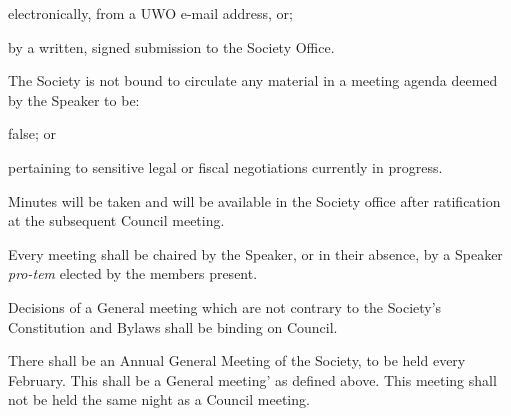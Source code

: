 \begin{longenum}[ label*=\thesubsection.\arabic*., align=left]
    \begin{longenum}[ label*=\arabic*., align=left]
		\item electronically, from a UWO e-mail address, or;
        \item by a written, signed submission to the Society Office.
	\end{longenum}
    \item The Society is not bound to circulate any material in a meeting agenda deemed by the Speaker to be:
    \begin{longenum}[ label*=\arabic*., align=left]
		\item false; or
        \item pertaining to sensitive legal or fiscal negotiations currently in progress.
	\end{longenum}
    \item Minutes will be taken and will be available in the Society office after ratification at the subsequent Council meeting.

    \item Every meeting shall be chaired by the Speaker, or in their absence, by a Speaker  \textit{pro-tem} elected by the members present.
    \item Decisions of a General meeting which are not contrary to the Society's Constitution and Bylaws shall be binding on Council.
    \item There shall be an Annual General Meeting of the Society, to be held every February. This shall be a General  meeting' as defined above. This meeting shall not be held the same night as a Council meeting. 
\end{longenum}
